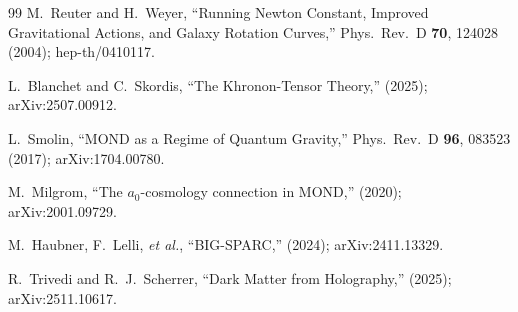 \documentclass[aps,prd,preprint,superscriptaddress,longbibliography]{revtex4-2}
\begin{document}
\begin{thebibliography}{99}
M.~Reuter and H.~Weyer,
``Running Newton Constant, Improved Gravitational Actions, and
Galaxy Rotation Curves,''
Phys.\ Rev.\ D \textbf{70}, 124028 (2004);
hep-th/0410117.

L.~Blanchet and C.~Skordis,
``The Khronon-Tensor Theory,''
(2025); arXiv:2507.00912.

L.~Smolin,
``MOND as a Regime of Quantum Gravity,''
Phys.\ Rev.\ D \textbf{96}, 083523 (2017);
arXiv:1704.00780.

M.~Milgrom,
``The $a_0$-cosmology connection in MOND,''
(2020); arXiv:2001.09729.

M.~Haubner, F.~Lelli, \emph{et al.},
``BIG-SPARC,''
(2024); arXiv:2411.13329.

R.~Trivedi and R.~J.~Scherrer,
``Dark Matter from Holography,''
(2025); arXiv:2511.10617.

\end{thebibliography}
\end{document}
